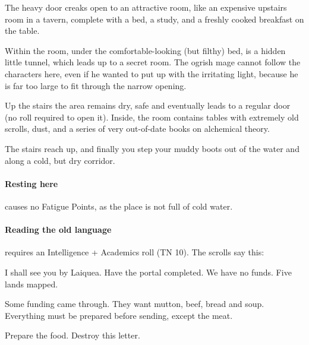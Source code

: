 \begin{multicols}{2}
\begin{boxtext}
  The heavy door creaks open to an attractive room, like an expensive upstairs room in a tavern, complete with a bed, a study, and a freshly cooked breakfast on the table.
\end{boxtext}

Within the room, under the comfortable-looking (but filthy) bed, is a hidden little tunnel, which leads up to a secret room.
The ogrish mage cannot follow the characters here, even if he wanted to put up with the irritating light, because he is far too large to fit through the narrow opening.


Up the stairs the area remains dry, safe and eventually leads to a regular door (no roll required to open it).
Inside, the room contains tables with extremely old scrolls, dust, and a series of very out-of-date books on alchemical theory.

\begin{boxtext}

  The stairs reach up, and finally you step your muddy boots out of the water and along a cold, but dry corridor.

\end{boxtext}

\paragraph{Resting here}
causes no Fatigue Points, as the place is not full of cold water.

\paragraph{Reading the old language}
requires an Intelligence + Academics roll (TN 10).
The scrolls say this:

\begin{exampletext}

  I shall see you by Laiquea.  Have the portal completed.  We have no funds.  Five lands mapped.

\end{exampletext}

\begin{exampletext}

  Some funding came through.  They want mutton, beef, bread and soup.  Everything must be prepared before sending, except the meat.

  Prepare the food.  Destroy this letter.


\end{exampletext}
\end{multicols}

